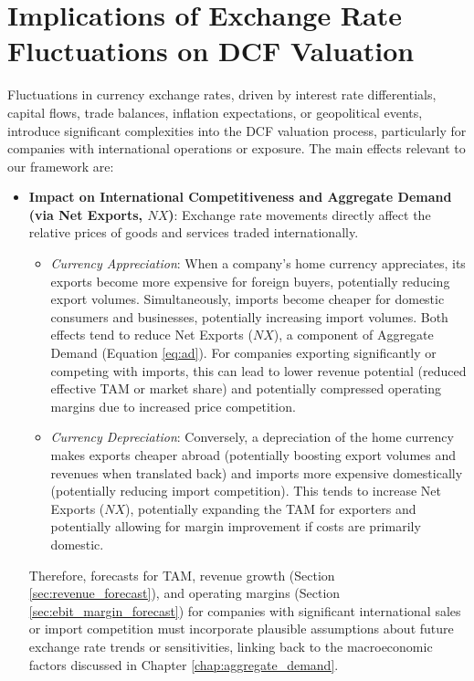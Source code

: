 \section{Implications of Exchange Rate Fluctuations on DCF Valuation} \label{sec:exchange_rate_implications}

Fluctuations in currency exchange rates, driven by interest rate differentials, capital flows, trade balances, inflation expectations, or geopolitical events, introduce significant complexities into the DCF valuation process, particularly for companies with international operations or exposure. The main effects relevant to our framework are:

\begin{itemize}
    \item \textbf{Impact on International Competitiveness and Aggregate Demand (via Net Exports, \(NX\))}: Exchange rate movements directly affect the relative prices of goods and services traded internationally.
          \begin{itemize}
              \item \textit{Currency Appreciation}: When a company's home currency appreciates, its exports become more expensive for foreign buyers, potentially reducing export volumes. Simultaneously, imports become cheaper for domestic consumers and businesses, potentially increasing import volumes. Both effects tend to reduce Net Exports (\(NX\)), a component of Aggregate Demand (Equation \ref{eq:ad}). For companies exporting significantly or competing with imports, this can lead to lower revenue potential (reduced effective TAM or market share) and potentially compressed operating margins due to increased price competition.
              \item \textit{Currency Depreciation}: Conversely, a depreciation of the home currency makes exports cheaper abroad (potentially boosting export volumes and revenues when translated back) and imports more expensive domestically (potentially reducing import competition). This tends to increase Net Exports (\(NX\)), potentially expanding the TAM for exporters and potentially allowing for margin improvement if costs are primarily domestic.
          \end{itemize}
          Therefore, forecasts for TAM, revenue growth (Section \ref{sec:revenue_forecast}), and operating margins (Section \ref{sec:ebit_margin_forecast}) for companies with significant international sales or import competition must incorporate plausible assumptions about future exchange rate trends or sensitivities, linking back to the macroeconomic factors discussed in Chapter \ref{chap:aggregate_demand}.


\end{itemize}
